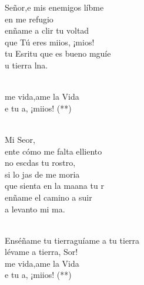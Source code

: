 \documentclass[12pt]{article}
\begin{document}
\begin{multicols*}{2}
\begin{cancion}%
	 Señor,e mis enemigos líbme\\
	en  me refugio\\
	enñame a clir tu voltad\\
	que Tú eres miios, ¡mios!\\
	tu Esritu que es bueno mguíe\\
	 u tierra lna.\\\jump\\
	\begin{chorus}%
	me vida,ame la Vida\\
	e tu a, ¡miios! (**)\\
	\end{chorus}%
	\jump\\
	Mi Seor, \\
	ente cómo me falta elliento\\
	no escdas tu rostro, \\
	si lo jas de  me moria \\
	 que sienta en la maana tu r\\
	enñame el camino a suir  \\
	a  levanto mi ma.\\\jump\\
	\begin{chorus}%
	Enséñame tu tierraguíame a tu tierra\\
	lévame a tierra, Sor! \\
	me vida,ame la Vida\\
	e tu a, ¡miios! (**)\\
	\end{chorus}%
	\jump\\
\end{cancion}%


\end{multicols*}
\end{document}
